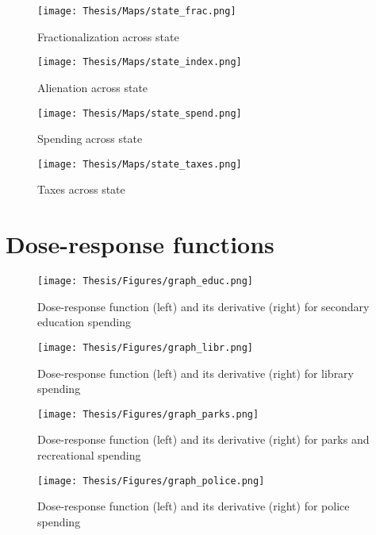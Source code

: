 \documentclass[12pt]{article}
\begin{document}
\begin{figure}[h!]
    \centering
    \texttt{[image: Thesis/Maps/state\_frac.png]}
    \caption{Fractionalization across state}
    \label{fig:frac_map}
\end{figure}

\begin{figure}[h!]
    \centering
    \texttt{[image: Thesis/Maps/state\_index.png]}
    \caption{Alienation across state}
    \label{fig:frac_map}
\end{figure}

\begin{figure}[h!]
    \centering
    \texttt{[image: Thesis/Maps/state\_spend.png]}
    \caption{Spending across state}
    \label{fig:frac_map}
\end{figure}

\begin{figure}[h!]
    \centering
    \texttt{[image: Thesis/Maps/state\_taxes.png]}
    \caption{Taxes across state}
    \label{fig:frac_map}
\end{figure}

\newpage
\section{Dose-response functions}

\begin{figure}[h!]
    \centering
    \texttt{[image: Thesis/Figures/graph\_educ.png]}
    \caption{Dose-response function (left) and its derivative (right) for secondary education spending}
    \label{fig:graph_educ}
\end{figure}

\begin{figure}[h!]
    \centering
    \texttt{[image: Thesis/Figures/graph\_libr.png]}
    \caption{Dose-response function (left) and its derivative (right) for library spending}
    \label{fig:graph_educ}
\end{figure}

\begin{figure}[h!]
    \centering
    \texttt{[image: Thesis/Figures/graph\_parks.png]}
    \caption{Dose-response function (left) and its derivative (right) for parks and recreational spending}
    \label{fig:graph_educ}
\end{figure}

\begin{figure}[h!]
    \centering
    \texttt{[image: Thesis/Figures/graph\_police.png]}
    \caption{Dose-response function (left) and its derivative (right) for police spending}
    \label{fig:graph_educ}
\end{figure}
\end{document}
